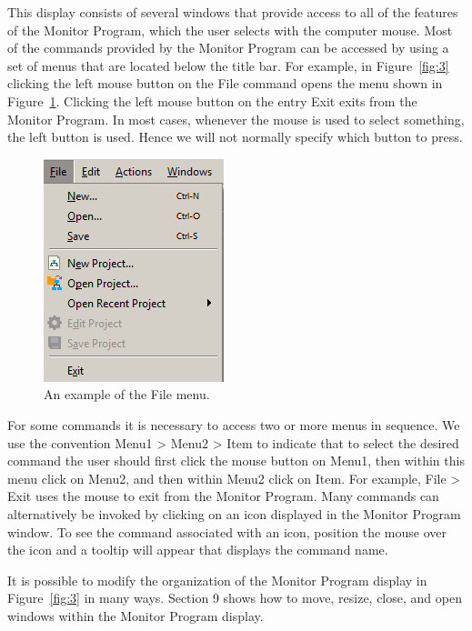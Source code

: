 \documentclass[11pt, twoside, pdftex]{article}
\begin{document}
This display consists of several windows that provide access to all of the features of the Monitor Program, which the user
selects with the computer mouse. Most of the commands 
provided by the Monitor Program can be accessed by using a set of
menus that are located below the title bar. For example, in
Figure~\ref{fig:3} clicking the left mouse button on
the {\sf File} command opens the menu shown in 
Figure~\ref{fig:4}. Clicking the left mouse 
button on the entry {\sf Exit} exits from the Monitor Program.  In most cases, whenever the mouse is used to select something,
the left button is used. Hence we will not normally specify which 
button to press. 

\begin{figure}[H]
   \begin{center}
      \includegraphics[scale=1]{screenshots/figure4.png}
   \end{center}
   \caption{An example of the {\sf File} menu.}
	 \label{fig:4}
	
\end{figure}

For some commands it is necessary to access two or more menus in
sequence. We use the convention {\sf Menu1 > Menu2 > Item} to
indicate that to select the desired command 
the user should first click the mouse button on {\sf Menu1}, 
then within this menu click on {\sf Menu2}, and then 
within {\sf Menu2} click on {\sf Item}. For example, 
{\sf File > Exit} uses the mouse to exit from the Monitor
Program. Many commands can alternatively be invoked 
by clicking on an icon displayed in the Monitor Program window. To see the command associated with an icon, position the mouse
over the icon and a tooltip will appear that displays 
the command name.

It is possible to modify the organization of the Monitor Program
display in Figure~\ref{fig:3} in many ways. 
Section 9 shows how to move, resize, close, and open windows
within the Monitor Program display.
\end{document}
